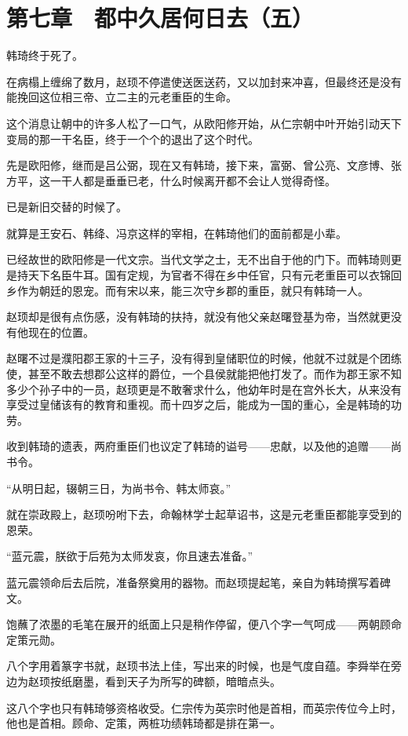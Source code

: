 \section{第七章　都中久居何日去（五）}

韩琦终于死了。

在病榻上缠绵了数月，赵顼不停遣使送医送药，又以加封来冲喜，但最终还是没有能挽回这位相三帝、立二主的元老重臣的生命。

这个消息让朝中的许多人松了一口气，从欧阳修开始，从仁宗朝中叶开始引动天下变局的那一干名臣，终于一个个的退出了这个时代。

先是欧阳修，继而是吕公弼，现在又有韩琦，接下来，富弼、曾公亮、文彦博、张方平，这一干人都是垂垂已老，什么时候离开都不会让人觉得奇怪。

已是新旧交替的时候了。

就算是王安石、韩绛、冯京这样的宰相，在韩琦他们的面前都是小辈。

已经故世的欧阳修是一代文宗。当代文学之士，无不出自于他的门下。而韩琦则更是持天下名臣牛耳。国有定规，为官者不得在乡中任官，只有元老重臣可以衣锦回乡作为朝廷的恩宠。而有宋以来，能三次守乡郡的重臣，就只有韩琦一人。

赵顼却是很有点伤感，没有韩琦的扶持，就没有他父亲赵曙登基为帝，当然就更没有他现在的位置。

赵曙不过是濮阳郡王家的十三子，没有得到皇储职位的时候，他就不过就是个团练使，甚至不敢去想郡公这样的爵位，一个县侯就能把他打发了。而作为郡王家不知多少个孙子中的一员，赵顼更是不敢奢求什么，他幼年时是在宫外长大，从来没有享受过皇储该有的教育和重视。而十四岁之后，能成为一国的重心，全是韩琦的功劳。

收到韩琦的遗表，两府重臣们也议定了韩琦的谥号——忠献，以及他的追赠——尚书令。

“从明日起，辍朝三日，为尚书令、韩太师哀。”

就在崇政殿上，赵顼吩咐下去，命翰林学士起草诏书，这是元老重臣都能享受到的恩荣。

“蓝元震，朕欲于后苑为太师发哀，你且速去准备。”

蓝元震领命后去后院，准备祭奠用的器物。而赵顼提起笔，亲自为韩琦撰写着碑文。

饱蘸了浓墨的毛笔在展开的纸面上只是稍作停留，便八个字一气呵成——两朝顾命定策元勋。

八个字用着篆字书就，赵顼书法上佳，写出来的时候，也是气度自蕴。李舜举在旁边为赵顼按纸磨墨，看到天子为所写的碑额，暗暗点头。

这八个字也只有韩琦够资格收受。仁宗传为英宗时他是首相，而英宗传位今上时，他也是首相。顾命、定策，两桩功绩韩琦都是排在第一。

